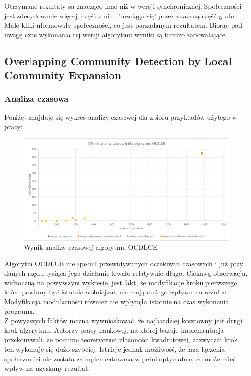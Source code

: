 \documentclass{article}
\begin{document}
Otrzymane rezultaty sa znacząco inne niż w wersji synchronicznej. Społeczności jest zdecydowanie więcej, część z nich 'rozciąga się' przez znaczną część grafu. Małe kliki uformowały społeczności, co jest porządanym rezultatem. Biorąc pod uwagę czas wykonania tej wersji algorytmu wyniki są bardzo zadowalające.

\subsection{Overlapping Community Detection by Local Community Expansion}
\subsubsection{Analiza czasowa}
Poniżej znajduje się wykres analizy czasowej dla zbioru przykładów użytego w pracy:
\begin{figure}[H]
\centering
\includegraphics[width=\textwidth]{images/bt-time.png}
\caption{Wynik analizy czasowej algorytmu OCDLCE}
\end{figure}

Algorytm OCDLCE nie spełnił przewidywanych oczekiwań czasowych i już przy danych rzędu tysiąca jego działanie trwało relatywnie długo. Ciekawą obserwacją, widzoczną na powyższym wykresie, jest fakt, że modyfikacje kroku pierwszego, które powinny być istotnie wolniejsze, nie mają dużego wpływu na rezultat. Modyfikacja modularności również nie wpłynęła istotnie na czas wykonania programu.\\

Z powyższych faktów można wywnioskować, że najbardziej kosztowny jest drugi krok algorytmu. Autorzy pracy naukowej, na której bazuje implementacja przekonywali, że pomimo teoretycznej złożoności kwadratowej, zazwyczaj krok ten wykonuje się dużo szybciej. Istnieje jednak możliwość, że faza łączenia społeczności nie została zaimplementowana w pełni optymalnie, co może mieć wpływ na uzyskany rezultat.\\
\end{document}
